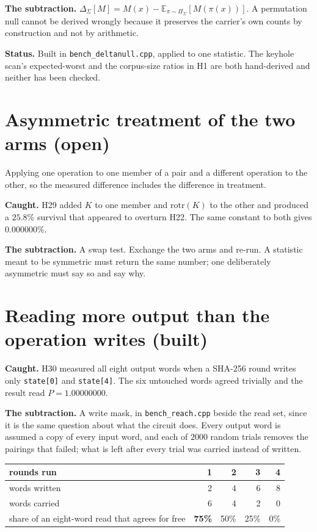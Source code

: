 \textbf{The subtraction.} \(\Delta_\Sigma[M] = M(x) - \mathbb{E}_{\pi \sim \Pi_\Sigma}[M(\pi(x))]\). A permutation null cannot be derived wrongly because it preserves the carrier's own counts by construction and not by arithmetic.

\textbf{Status.} Built in \texttt{bench\_deltanull.cpp}, applied to one statistic. The keyhole scan's expected-worst and the corpus-size ratios in H1 are both hand-derived and neither has been checked.

\section{Asymmetric treatment of the two arms (open)}

Applying one operation to one member of a pair and a different operation to the other, so the measured difference includes the difference in treatment.

\textbf{Caught.} H29 added \(K\) to one member and \(\mathrm{rotr}(K)\) to the other and produced a \(25.8\%\) survival that appeared to overturn H22. The same constant to both gives \(0.000000\%\).

\textbf{The subtraction.} A swap test. Exchange the two arms and re-run. A statistic meant to be symmetric must return the same number; one deliberately asymmetric must say so and say why.

\section{Reading more output than the operation writes (built)}

\textbf{Caught.} H30 measured all eight output words when a SHA-256 round writes only \texttt{state[0]} and \texttt{state[4]}. The six untouched words agreed trivially and the result read \(P = 1.00000000\).

\textbf{The subtraction.} A write mask, in \texttt{bench\_reach.cpp} beside the read set, since it is the same question about what the circuit does. Every output word is assumed a copy of every input word, and each of \(2000\) random trials removes the pairings that failed; what is left after every trial was carried instead of written.

\begin{center}
\begin{tabular}{@{}lrrrr@{}}
\toprule
rounds run & 1 & 2 & 3 & 4 \\
\midrule
words written & 2 & 4 & 6 & 8 \\
words carried & 6 & 4 & 2 & 0 \\
share of an eight-word read that agrees for free & \textbf{75\%} & 50\% & 25\% & 0\% \\
\bottomrule
\end{tabular}
\end{center}

